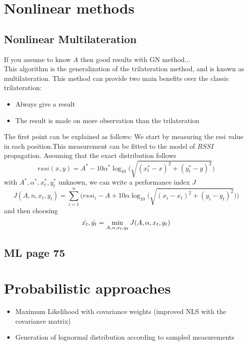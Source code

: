 \documentclass[12pt]{report}
\begin{document}
\section{Nonlinear methods}
\subsection{Nonlinear Multilateration}
If you assume to know $A$ then good results with GN method...\\
This algorithm is the generalization of the trilateration method, and is known as multilateration. 
This method can provide two main benefits over the classic trilateration:
\begin{itemize}
    \item Always give a result
    \item The result is made on more observation than the trilateration
\end{itemize}
The first point can be explained as follows:
We start by measuring the rssi value in each position.This measurement can be fitted to the model of $RSSI$ propagation. Assuming that the exact distribution follows 
\begin{equation}
rssi(x,y)=A^*-10\alpha^*\log_{10}\big(\sqrt{(x_t^*-x)^2+(y_t^*-y)^2}\big)    
\end{equation}
with $A^*,\alpha^*,x^*_t,y^*_t$ unknown, we can write a performance index $J$
\begin{equation}
    J(A,n,x_t,y_t)=\sum_{i=1}^n\bigg(rssi_i-A+10\alpha\log_{10}\big(\sqrt{(x_i-x_t)^2+(y_i-y_t)^2}\big)\bigg)
\end{equation}
and then choosing 
\begin{equation}
\Bar{x_t}, \Bar{y_t}=\min_{A,\alpha,x_t,y_t}J(A,\alpha,x_t,y_t)
\end{equation}
\clearpage

\subsection{ML page 75}


\clearpage

\section{Probabilistic approaches}
\begin{itemize}
    \item Maximum Likelihood with covariance weights (improved NLS with the covariance matrix)
    \item Generation of lognormal distribution according to sampled measurements
\end{itemize}
\clearpage
\end{document}
